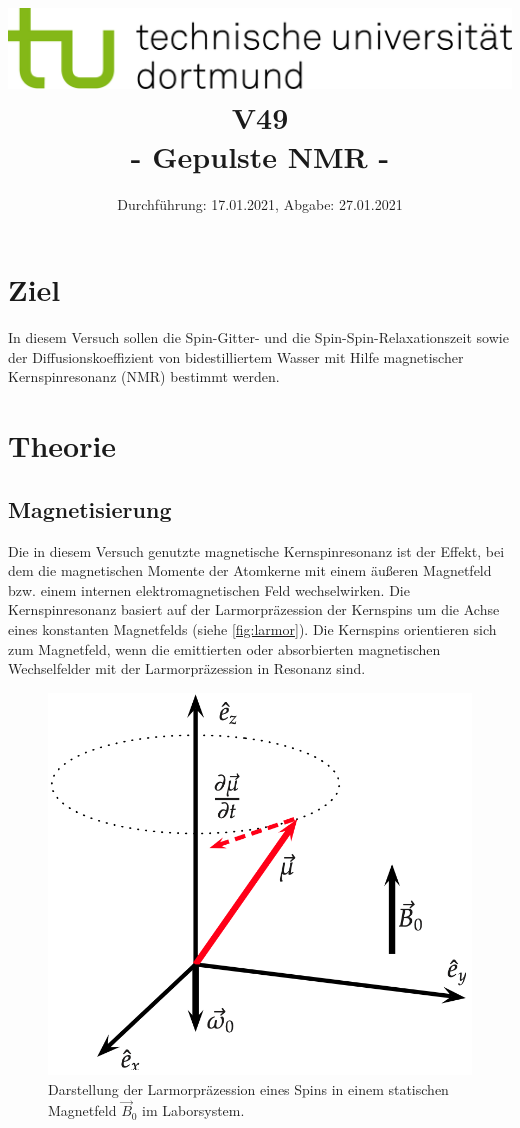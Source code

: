 
\usepackage{romannum}
\usepackage{listings}
\lstset{numbers=left, numberstyle=\tiny, numbersep=5pt}
\lstset{language=Perl}

\title{\includegraphics[scale=0.8]{../logo.jpg} \\ \vspace*{1cm} V49 \\ - Gepulste NMR -}

\date{Durchführung: 17.01.2021, Abgabe: 27.01.2021}



\maketitle

\tableofcontents
\newpage

\section{Ziel}
In diesem Versuch sollen die Spin-Gitter- und die Spin-Spin-Relaxationszeit sowie der Diffusionskoeffizient von bidestilliertem Wasser mit Hilfe magnetischer Kernspinresonanz (NMR) bestimmt werden.


\section{Theorie}
\label{sec:Theorie}

\subsection{Magnetisierung} %
Die in diesem Versuch genutzte magnetische Kernspinresonanz ist der Effekt, bei dem die magnetischen Momente der Atomkerne mit einem äußeren Magnetfeld bzw. einem internen elektromagnetischen Feld wechselwirken.
Die Kernspinresonanz basiert auf der Larmorpräzession der Kernspins um die Achse eines konstanten Magnetfelds (siehe \autoref{fig:larmor}).
Die Kernspins orientieren sich zum Magnetfeld, wenn die emittierten oder absorbierten magnetischen Wechselfelder mit der Larmorpräzession in Resonanz sind.

\begin{figure}
    \centering
    \includegraphics[width=0.3\linewidth]{./figures/larmor.png}
    \caption{Darstellung der Larmorpräzession eines Spins in einem statischen Magnetfeld $\vec{B}_0$ im Laborsystem. \cite{Anleitung}}
    \label{fig:larmor}
\end{figure}

